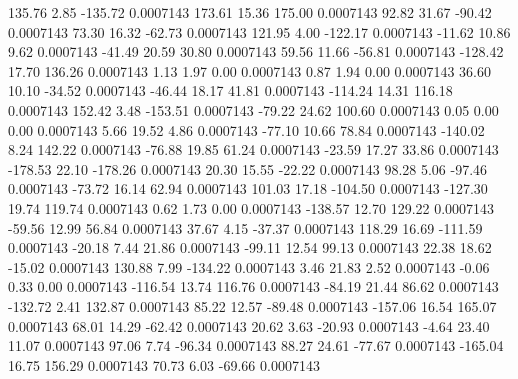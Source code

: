      135.76        2.85     -135.72     0.0007143
      173.61       15.36      175.00     0.0007143
       92.82       31.67      -90.42     0.0007143
       73.30       16.32      -62.73     0.0007143
      121.95        4.00     -122.17     0.0007143
      -11.62       10.86        9.62     0.0007143
      -41.49       20.59       30.80     0.0007143
       59.56       11.66      -56.81     0.0007143
     -128.42       17.70      136.26     0.0007143
        1.13        1.97        0.00     0.0007143
        0.87        1.94        0.00     0.0007143
       36.60       10.10      -34.52     0.0007143
      -46.44       18.17       41.81     0.0007143
     -114.24       14.31      116.18     0.0007143
      152.42        3.48     -153.51     0.0007143
      -79.22       24.62      100.60     0.0007143
        0.05        0.00        0.00     0.0007143
        5.66       19.52        4.86     0.0007143
      -77.10       10.66       78.84     0.0007143
     -140.02        8.24      142.22     0.0007143
      -76.88       19.85       61.24     0.0007143
      -23.59       17.27       33.86     0.0007143
     -178.53       22.10     -178.26     0.0007143
       20.30       15.55      -22.22     0.0007143
       98.28        5.06      -97.46     0.0007143
      -73.72       16.14       62.94     0.0007143
      101.03       17.18     -104.50     0.0007143
     -127.30       19.74      119.74     0.0007143
        0.62        1.73        0.00     0.0007143
     -138.57       12.70      129.22     0.0007143
      -59.56       12.99       56.84     0.0007143
       37.67        4.15      -37.37     0.0007143
      118.29       16.69     -111.59     0.0007143
      -20.18        7.44       21.86     0.0007143
      -99.11       12.54       99.13     0.0007143
       22.38       18.62      -15.02     0.0007143
      130.88        7.99     -134.22     0.0007143
        3.46       21.83        2.52     0.0007143
       -0.06        0.33        0.00     0.0007143
     -116.54       13.74      116.76     0.0007143
      -84.19       21.44       86.62     0.0007143
     -132.72        2.41      132.87     0.0007143
       85.22       12.57      -89.48     0.0007143
     -157.06       16.54      165.07     0.0007143
       68.01       14.29      -62.42     0.0007143
       20.62        3.63      -20.93     0.0007143
       -4.64       23.40       11.07     0.0007143
       97.06        7.74      -96.34     0.0007143
       88.27       24.61      -77.67     0.0007143
     -165.04       16.75      156.29     0.0007143
       70.73        6.03      -69.66     0.0007143
